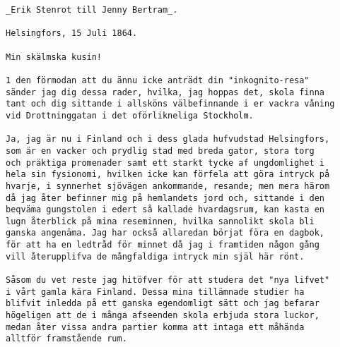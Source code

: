 \begin{verbatim}
_Erik Stenrot till Jenny Bertram_.

Helsingfors, 15 Juli 1864.

Min skälmska kusin!

1 den förmodan att du ännu icke anträdt din "inkognito-resa"
sänder jag dig dessa rader, hvilka, jag hoppas det, skola finna
tant och dig sittande i allsköns välbefinnande i er vackra våning
vid Drottninggatan i det oförlikneliga Stockholm.

Ja, jag är nu i Finland och i dess glada hufvudstad Helsingfors,
som är en vacker och prydlig stad med breda gator, stora torg
och präktiga promenader samt ett starkt tycke af ungdomlighet i
hela sin fysionomi, hvilken icke kan förfela att göra intryck på
hvarje, i synnerhet sjövägen ankommande, resande; men mera härom
då jag åter befinner mig på hemlandets jord och, sittande i den
beqväma gungstolen i edert så kallade hvardagsrum, kan kasta en
lugn återblick på mina reseminnen, hvilka sannolikt skola bli
ganska angenäma. Jag har också allaredan börjat föra en dagbok,
för att ha en ledtråd för minnet då jag i framtiden någon gång
vill återupplifva de mångfaldiga intryck min själ här rönt.

Såsom du vet reste jag hitöfver för att studera det "nya lifvet"
i vårt gamla kära Finland. Dessa mina tillämnade studier ha
blifvit inledda på ett ganska egendomligt sätt och jag befarar
högeligen att de i många afseenden skola erbjuda stora luckor,
medan åter vissa andra partier komma att intaga ett måhända
alltför framstående rum.


\end{verbatim}
